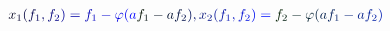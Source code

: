 \documentclass[12pt]{article}
\begin{document}
\makeatletter
\renewcommand*{\@textcolor}[3]{%
  \protect\leavevmode
  \begingroup
    \color#1{#2}#3%
  \endgroup
}
\makeatother
\begin{displaymath}
\begin{array} {l} \mathcolor[RGB]{0,0,15}{\textstyle} { \mathcolor[RGB]{0,0,30}{x} _ { \mathcolor[RGB]{0,0,45}{1} } \mathcolor[RGB]{0,0,60}{(} \mathcolor[RGB]{0,0,75}{f} _ { \mathcolor[RGB]{0,0,90}{1} } \mathcolor[RGB]{0,0,105}{,} \mathcolor[RGB]{0,0,120}{f} _ { \mathcolor[RGB]{0,0,135}{2} } \mathcolor[RGB]{0,0,150}{)} \mathcolor[RGB]{0,0,165}{=} \mathcolor[RGB]{0,0,180}{f} _ { \mathcolor[RGB]{0,0,195}{1} } \mathcolor[RGB]{0,0,210}{-} \mathcolor[RGB]{0,0,225}{\varphi} \mathcolor[RGB]{0,0,240}{(} \mathcolor[RGB]{0,0,255}{a} \mathcolor[RGB]{0,15,0}{f} _ { \mathcolor[RGB]{0,15,15}{1} } \mathcolor[RGB]{0,15,30}{-} \mathcolor[RGB]{0,15,45}{a} \mathcolor[RGB]{0,15,60}{f} _ { \mathcolor[RGB]{0,15,75}{2} } \mathcolor[RGB]{0,15,90}{)} \mathcolor[RGB]{0,15,105}{,} \mathcolor[RGB]{0,15,120}{x} _ { \mathcolor[RGB]{0,15,135}{2} } \mathcolor[RGB]{0,15,150}{(} \mathcolor[RGB]{0,15,165}{f} _ { \mathcolor[RGB]{0,15,180}{1} } \mathcolor[RGB]{0,15,195}{,} \mathcolor[RGB]{0,15,210}{f} _ { \mathcolor[RGB]{0,15,225}{2} } \mathcolor[RGB]{0,15,240}{)} \mathcolor[RGB]{0,15,255}{=} \mathcolor[RGB]{0,30,0}{f} _ { \mathcolor[RGB]{0,30,15}{2} } \mathcolor[RGB]{0,30,30}{-} \mathcolor[RGB]{0,30,45}{\varphi} \mathcolor[RGB]{0,30,60}{(} \mathcolor[RGB]{0,30,75}{a} \mathcolor[RGB]{0,30,90}{f} _ { \mathcolor[RGB]{0,30,105}{1} } \mathcolor[RGB]{0,30,120}{-} \mathcolor[RGB]{0,30,135}{a} \mathcolor[RGB]{0,30,150}{f} _ { \mathcolor[RGB]{0,30,165}{2} } \mathcolor[RGB]{0,30,180}{)} } \end{array}
\end{displaymath}
\end{document}
